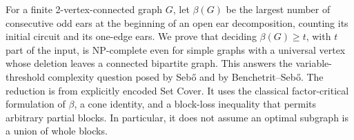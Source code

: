 
For a finite 2-vertex-connected graph \(G\), let \(\beta(G)\) be the largest
number of consecutive odd ears at the beginning of an open ear decomposition,
counting its initial circuit and its one-edge ears. We prove that deciding
\(\beta(G)\ge t\), with \(t\) part of the input, is NP-complete even for simple
graphs with a universal vertex whose deletion leaves a connected bipartite
graph. This answers the variable-threshold complexity question posed by
Seb\H{o} and by Benchetrit--Seb\H{o}. The reduction is from explicitly encoded
Set Cover. It uses the classical factor-critical formulation of \(\beta\),
a cone identity, and a block-loss inequality that permits arbitrary partial
blocks. In particular, it does not assume an optimal subgraph is a union of
whole blocks.
